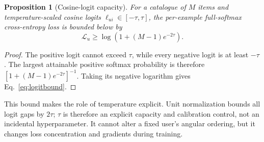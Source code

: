 \documentclass[sigconf,anonymous,review]{acmart}
\newtheorem{proposition}{Proposition}
\begin{document}
\begin{proposition}[Cosine-logit capacity]
For a catalogue of $M$ items and temperature-scaled cosine logits
$\ell_{ui}\in[-\tau,\tau]$, the per-example full-softmax cross-entropy loss
is bounded below by
\begin{equation}
\mathcal L_{u}\geq \log\!\left(1+(M-1)e^{-2\tau}\right).\label{eq:logitbound}
\end{equation}
\end{proposition}
\begin{proof}
The positive logit cannot exceed $\tau$, while every negative logit is at
least $-\tau$. The largest attainable positive softmax probability is therefore
$[1+(M-1)e^{-2\tau}]^{-1}$. Taking its negative logarithm gives
Eq.~\ref{eq:logitbound}.
\end{proof}
This bound makes the role of temperature explicit. Unit normalization bounds all logit gaps by $2\tau$; $\tau$ is therefore an explicit capacity and calibration control, not an incidental hyperparameter. It cannot alter a fixed user's angular ordering, but it changes loss concentration and gradients during training.
\end{document}
